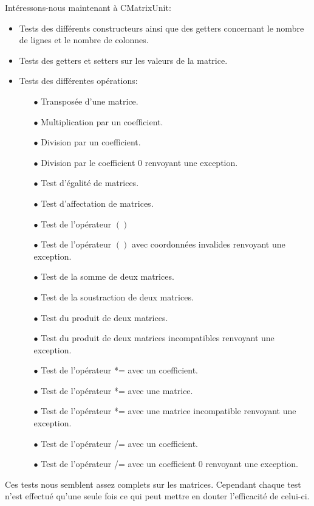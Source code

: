 		Intéressons-nous maintenant à CMatrixUnit:
		\begin{itemize}
			\item Tests des différents constructeurs ainsi que des getters concernant le nombre de lignes et le nombre de colonnes.
			\item Tests des getters et setters sur les valeurs de la matrice.
			\item Tests des différentes opérations:
			\begin{itemize}
				\item[$\bullet$] Transposée d'une matrice.
				\item[$\bullet$] Multiplication par un coefficient.
				\item[$\bullet$] Division par un coefficient.
				\item[$\bullet$] Division par le coefficient 0 renvoyant une exception.
				\item[$\bullet$] Test d'égalité de matrices.
				\item[$\bullet$] Test d'affectation de matrices.
				\item[$\bullet$] Test de l'opérateur $\left(\right)$
				\item[$\bullet$] Test de l'opérateur $\left(\right)$ avec coordonnées invalides renvoyant une exception.
				\item[$\bullet$] Test de la somme de deux matrices.
				\item[$\bullet$] Test de la soustraction de deux matrices.
				\item[$\bullet$] Test du produit de deux matrices.
				\item[$\bullet$] Test du produit de deux matrices incompatibles renvoyant une exception.
				\item[$\bullet$] Test de l'opérateur *= avec un coefficient.
				\item[$\bullet$] Test de l'opérateur *= avec une matrice.
				\item[$\bullet$] Test de l'opérateur *= avec une matrice incompatible renvoyant une exception.
				\item[$\bullet$] Test de l'opérateur /= avec un coefficient.
				\item[$\bullet$] Test de l'opérateur /= avec un coefficient 0 renvoyant une exception.\\
			\end{itemize}
		\end{itemize}
		
		Ces tests nous semblent assez complets sur les matrices. Cependant chaque test n'est effectué qu'une seule fois ce qui peut mettre en douter l'efficacité de celui-ci.
		
